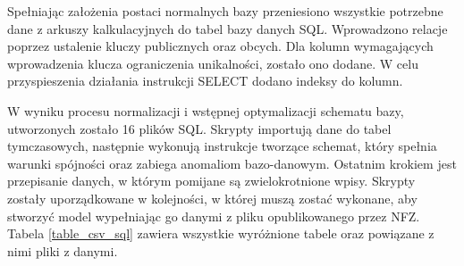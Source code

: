 Spełniając założenia postaci normalnych bazy przeniesiono wszystkie potrzebne dane z arkuszy kalkulacyjnych do tabel bazy danych SQL. Wprowadzono relacje poprzez ustalenie kluczy publicznych oraz obcych. Dla kolumn wymagających wprowadzenia klucza ograniczenia unikalności, zostało ono dodane. W celu przyspieszenia działania instrukcji SELECT dodano indeksy do kolumn.
 
W wyniku procesu normalizacji i wstępnej optymalizacji schematu bazy, utworzonych zostało 16 plików SQL. Skrypty importują dane do tabel tymczasowych, następnie wykonują instrukcje tworzące schemat, który spełnia warunki spójności oraz zabiega anomaliom bazo-danowym. Ostatnim krokiem jest przepisanie danych, w którym pomijane są zwielokrotnione wpisy. Skrypty zostały uporządkowane w kolejności, w której muszą zostać wykonane, aby stworzyć model wypełniając go danymi z pliku opublikowanego przez NFZ. Tabela \ref{table_csv_sql} zawiera wszystkie wyróżnione tabele oraz powiązane z nimi pliki z danymi.


